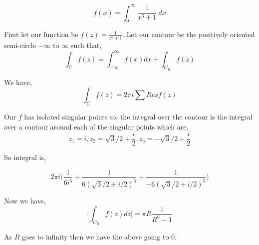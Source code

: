 \begin{eg}
   
   $$ f(x) = \int_{{0}}^{{\infty}} {\frac{1}{x^{6}+1}} \: d{x} {} $$ 

   First let our function be $f(z) = \frac{1}{z^{6} + 1}$. Let our contour be the positively oriented semi-circle $-\infty$ to $\infty$ such that,  
   $$ \int_C f(z) = \int_{-\infty}^{\infty} f(x) dx + \int_{C_R}f(z) $$ 

   We have, 
   $$ \int_C f(z) = 2\pi i \sum Res f(z) $$ 

   Our $f$ has isolated singular points so, the integral over the contour is the integral  over a contour around each of the singular points which are, 
   $$ z_1 = i, z_2 = \sqrt{3}/2 + \frac{i}{2}, z_3 = -\sqrt{3}/2 + \frac{i}{2}  $$ 

   So integral is, 

$$ 2\pi i\bigg (\frac{1}{6i^{5}} + \frac{1}{6(\sqrt{3}/2 + i /2)^{5}} +\frac{1}{-6(\sqrt{3}/2 + i /2)^{5}}\bigg ) $$ 

Now we have, 
$$ \bigg | \int_{C_R} f(z) dz\bigg | = \pi R \frac{1}{R^{6} - 1} $$ 

As $R$ goes to infinity then we have the above going to $0$.

\end{eg}

